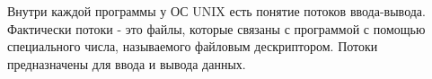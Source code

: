 Внутри каждой программы у ОС UNIX есть понятие потоков ввода-вывода. Фактически потоки - это файлы, которые связаны с программой с помощью специального числа, называемого файловым дескриптором. Потоки предназначены для ввода и вывода данных. 

